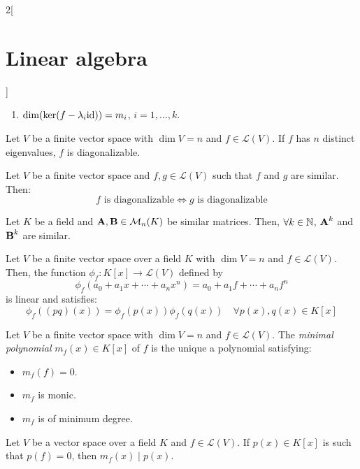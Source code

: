 \documentclass[../../../main_math.tex]{subfiles}
\begin{document}
\begin{multicols}{2}[\section{Linear algebra}]
\begin{theorem}
\begin{enumerate}
      \item $\dim(\ker(f-\lambda_i \mathrm{id}))=m_i$, $i=1,\ldots,k$.
    \end{enumerate}
  \end{theorem}
  \begin{corollary}
    Let $V$ be a finite vector space with $\dim V=n$ and $f\in\mathcal{L}(V)$. If $f$ has $n$ distinct eigenvalues, $f$ is diagonalizable.
  \end{corollary}
  \begin{proposition}
    Let $V$ be a finite vector space and $f,g\in\mathcal{L}(V)$ such that $f$ and $g$ are similar. Then: $$f\text{ is diagonalizable}\iff g\text{ is diagonalizable}$$
  \end{proposition}
  \begin{lemma}
    Let $K$ be a field and $\boldsymbol{\mathrm{A}},\boldsymbol{\mathrm{B}}\in\mathcal{M}_n(K)$ be similar matrices. Then, $\forall k\in\mathbb{N}$, $\boldsymbol{\mathrm{A}}^k$ and $\boldsymbol{\mathrm{B}}^k$ are similar.
  \end{lemma}
  \begin{lemma}
    Let $V$ be a finite vector space over a field $K$ with $\dim V=n$ and $f\in\mathcal{L}(V)$. Then, the function $\phi_f:K[x]\rightarrow\mathcal{L}(V)$ defined by $$\phi_f(a_0+a_1x+\cdots+a_nx^n)=a_0+a_1f+\cdots+a_nf^n$$
    is linear and satisfies: $$\phi_f((pq)(x))=\phi_f(p(x))\phi_f(q(x))\quad\forall p(x),q(x)\in K[x]$$
  \end{lemma}
  \begin{definition}
    Let $V$ be a finite vector space with $\dim V=n$ and $f\in\mathcal{L}(V)$. The \emph{minimal polynomial} $m_f(x)\in K[x]$ of $f$ is the unique a polynomial satisfying:
    \begin{itemize}
      \item $m_f(f)=0$.
      \item $m_f$ is monic.
      \item $m_f$ is of minimum degree.
    \end{itemize}
  \end{definition}
  \begin{proposition}
    Let $V$ be a vector space over a field $K$ and $f\in\mathcal{L}(V)$. If $p(x)\in K[x]$ is such that $p(f)=0$, then $m_f(x)\mid p(x)$.
  \end{proposition}

\end{multicols}
\end{document}
